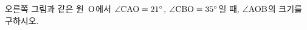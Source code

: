 \noindent\begin{minipage}[t]{0.58\linewidth}\vspace{0pt}\raggedright 오른쪽 그림과 같은 원~$\mathrm{O}$에서 $\angle\mathrm{CAO}=21^\circ$, $\angle\mathrm{CBO}=35^\circ$일 때, $\angle\mathrm{AOB}$의 크기를 구하시오.\end{minipage}\hfill\begin{minipage}[t]{0.4\linewidth}\vspace{0pt}\centering \resizebox{\ifdim\width>\linewidth\linewidth\else\width\fi}{!}{}\end{minipage}\par
